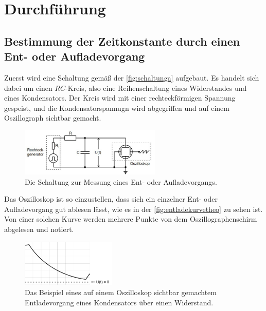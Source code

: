 \section{Durchführung}
\label{sec:Durchführung}

\subsection{Bestimmung der Zeitkonstante durch einen Ent- oder Aufladevorgang}

    Zuerst wird eine Schaltung gemäß der \autoref{fig:schaltunga} aufgebaut. Es handelt sich dabei um einen $RC$-Kreis, also eine Reihenschaltung eines Widerstandes
    und eines Kondensators. Der Kreis wird mit einer rechteckförmigen Spannung gespeist, und die Kondensatorspannugn wird abgegriffen und auf einem Oszillograph
    sichtbar gemacht. 

    \begin{figure}[H]
        \centering
        \includegraphics[width=0.6\textwidth]{bilder/aufbau_schaltunga.jpg}
        \caption{Die Schaltung zur Messung eines Ent- oder Aufladevorgangs. \cite{anleitung}}
        \label{fig:schaltunga}
    \end{figure}

    \noindent Das Oszilloskop ist so einzustellen, dass sich ein einzelner Ent- oder Aufladevorgang gut ablesen lässt, wie es in der \autoref{fig:entladekurvetheo}
    zu sehen ist. Von einer solchen Kurve werden mehrere Punkte von dem Oszillographenschirm abgelesen und notiert.

    \begin{figure}
        \centering
        \includegraphics[width=0.4\textwidth]{bilder/Entladekurve.PNG}
        \caption{Das Beispiel eines auf einem Oszilloskop sichtbar gemachtem Entladevorgang eines Kondensators über einen Widerstand. \cite{anleitung}}
        \label{fig:entladekurvetheo}
    \end{figure}



